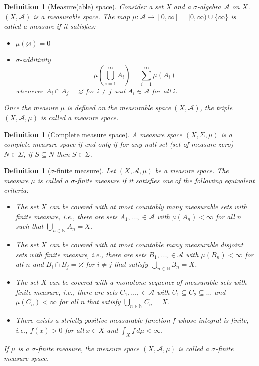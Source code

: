 \documentclass[11pt, letter]{book}
\newtheorem{definition}[theorem]{Definition}
\newcommand{\lp}{\left(}
\newcommand{\rp}{\right)}
\begin{document}
\begin{definition}[Measure(able) space]
Consider a set $X$ and a $\sigma$-algebra $\mathcal{A}$ on $X$. $(X, \mathcal{A})$ is a measurable space. The map $\mu : \mathcal{A} \to [0,\infty] = [0,\infty) \cup \{ \infty\}$ is called a measure if it satisfies:
\begin{itemize}
    \item $\mu(\varnothing) = 0$
    \item $\sigma$-additivity
    \begin{equation*}
        \mu \lp \bigcup^\infty_{i=1} A_i \rp = \sum^\infty_{i=1} \mu(A_i)
    \end{equation*}
    whenever $A_i \cap A_j = \varnothing$ for $i \neq j$ and $A_i \in \mathcal{A}$ for all $i$. 
\end{itemize}
Once the measure $\mu$ is defined on the measurable space $(X,\mathcal{A})$, the triple $(X,\mathcal{A},\mu)$ is called a measure space.  
\end{definition}
\begin{definition}[Complete measure space]
A measure space $(X,\Sigma, \mu)$ is a complete measure space if and only if for any null set (set of measure zero) $N\in \Sigma$, if $S\subseteq N$ then $S\in \Sigma$.
\end{definition}

\begin{definition}[$\sigma$-finite measure]
Let $(X,\mathcal{A}, \mu)$ be a measure space. The measure $\mu$ is called a $\sigma$-finite measure if it satisfies one of the following equivalent criteria:
\begin{itemize}
    \item The set $X$ can be covered with at most countably many measurable sets with finite measure, i.e., there are sets $A_1,\dots, \in \mathcal{A}$ with $\mu(A_n)< \infty$ for all $n$ such that $\bigcup_{n\in \mathbb{N}} A_n = X$.
    \item The set $X$ can be covered with at most countable many measurable disjoint sets with finite measure, i.e., there are sets $B_1,\dots, \in \mathcal{A}$ with $\mu(B_n) < \infty$ for all $n$ and $B_i \cap B_j = \varnothing$ for $i\neq j$ that satisfy $\bigcup_{n\in \mathbb{N}} B_n = X$.
    \item The set $X$ can be covered with a monotone sequence of measurable sets with finite measure, i.e., there are sets $C_1,\dots, \in \mathcal{A}$ with $C_1 \subseteq C_2 \subseteq \dots$ and $\mu(C_n) < \infty$ for all $n$ that satisfy $\bigcup_{n\in \mathbb{N}} C_n = X$.
    \item There exists a strictly positive measurable function $f$ whose integral is finite, i.e., $f(x) > 0$ for all $x\in X$ and $\int_X f\,d\mu < \infty$. 
\end{itemize}
If $\mu$ is a $\sigma$-finite measure, the measure space $(X,\mathcal{A},\mu)$ is called a $\sigma$-finite measure space. 
\end{definition}
\end{document}
